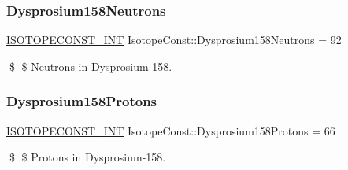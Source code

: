 \subsubsection{\texorpdfstring{Dysprosium158\+Neutrons}{Dysprosium158Neutrons}}
{\footnotesize\ttfamily \mbox{\hyperlink{group___isotope_const-_macros_ga5f18360b3e99483a35c32d789e62621c}{I\+S\+O\+T\+O\+P\+E\+C\+O\+N\+S\+T\+\_\+\+I\+NT}} Isotope\+Const\+::\+Dysprosium158\+Neutrons = 92}

\$ \$ Neutrons in Dysprosium-\/158. \mbox{\label{group___isotope_const-_dysprosium-_dy158_gac8978d8bf222377a435785a4524040eb}} 
\subsubsection{\texorpdfstring{Dysprosium158\+Protons}{Dysprosium158Protons}}
{\footnotesize\ttfamily \mbox{\hyperlink{group___isotope_const-_macros_ga5f18360b3e99483a35c32d789e62621c}{I\+S\+O\+T\+O\+P\+E\+C\+O\+N\+S\+T\+\_\+\+I\+NT}} Isotope\+Const\+::\+Dysprosium158\+Protons = 66}

\$ \$ Protons in Dysprosium-\/158. 